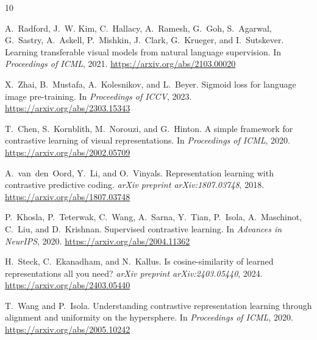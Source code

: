 \documentclass[11pt,a4paper]{article}
\theoremstyle{remark}
\begin{document}
\begin{thebibliography}{10}

A.~Radford, J.~W. Kim, C.~Hallacy, A.~Ramesh, G.~Goh, S.~Agarwal, G.~Sastry, A.~Askell, P.~Mishkin, J.~Clark, G.~Krueger, and I.~Sutskever.
\newblock Learning transferable visual models from natural language supervision.
\newblock In \emph{Proceedings of ICML}, 2021.
\newblock \url{https://arxiv.org/abs/2103.00020}

X.~Zhai, B.~Mustafa, A.~Kolesnikov, and L.~Beyer.
\newblock Sigmoid loss for language image pre-training.
\newblock In \emph{Proceedings of ICCV}, 2023.
\newblock \url{https://arxiv.org/abs/2303.15343}

T.~Chen, S.~Kornblith, M.~Norouzi, and G.~Hinton.
\newblock A simple framework for contrastive learning of visual representations.
\newblock In \emph{Proceedings of ICML}, 2020.
\newblock \url{https://arxiv.org/abs/2002.05709}

A.~van~den~Oord, Y.~Li, and O.~Vinyals.
\newblock Representation learning with contrastive predictive coding.
\newblock \emph{arXiv preprint arXiv:1807.03748}, 2018.
\newblock \url{https://arxiv.org/abs/1807.03748}

P.~Khosla, P.~Teterwak, C.~Wang, A.~Sarna, Y.~Tian, P.~Isola, A.~Maschinot, C.~Liu, and D.~Krishnan.
\newblock Supervised contrastive learning.
\newblock In \emph{Advances in NeurIPS}, 2020.
\newblock \url{https://arxiv.org/abs/2004.11362}

H.~Steck, C.~Ekanadham, and N.~Kallus.
\newblock Is cosine-similarity of learned representations all you need?
\newblock \emph{arXiv preprint arXiv:2403.05440}, 2024.
\newblock \url{https://arxiv.org/abs/2403.05440}

T.~Wang and P.~Isola.
\newblock Understanding contrastive representation learning through alignment and uniformity on the hypersphere.
\newblock In \emph{Proceedings of ICML}, 2020.
\newblock \url{https://arxiv.org/abs/2005.10242}

\end{thebibliography}
\end{document}

